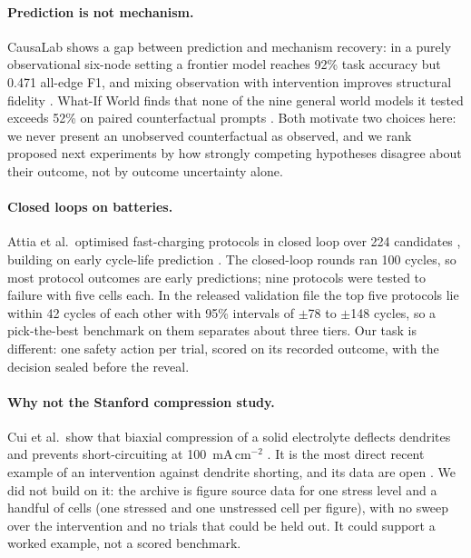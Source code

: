 \documentclass[11pt]{article}
\begin{document}
\paragraph{Prediction is not mechanism.} CausaLab shows a gap between prediction and mechanism recovery: in a purely
observational six-node setting a frontier model reaches 92\% task accuracy but 0.471 all-edge F1, and mixing
observation with intervention improves structural fidelity \citep{yang2026causalab}. What-If World finds that none
of the nine general world models it tested exceeds 52\% on paired counterfactual prompts \citep{cai2026whatif}. Both motivate two choices
here: we never present an unobserved counterfactual as observed, and we rank proposed next experiments by how
strongly competing hypotheses disagree about their outcome, not by outcome uncertainty alone.

\paragraph{Closed loops on batteries.} Attia et al.\ optimised fast-charging protocols in closed loop over 224
candidates \citep{attia2020closed}, building on early cycle-life prediction \citep{severson2019data}. The closed-loop
rounds ran 100 cycles, so most protocol outcomes are early predictions; nine protocols were tested to failure with
five cells each. In the released validation file the top five protocols lie within 42 cycles of each other with 95\%
intervals of $\pm$78 to $\pm$148 cycles, so a pick-the-best benchmark on them separates about three tiers. Our task is
different: one safety action per trial, scored on its recorded outcome, with the decision sealed before the reveal.

\paragraph{Why not the Stanford compression study.} Cui et al.\ show that biaxial compression of a solid electrolyte
deflects dendrites and prevents short-circuiting at 100~mA\,cm$^{-2}$ \citep{cui2026dendrite}. It is the most direct
recent example of an intervention against dendrite shorting, and its data are open \citep{cui2026dendrite_data}. We
did not build on it: the archive is figure source data for one stress level and a handful of cells (one stressed and
one unstressed cell per figure), with no sweep over the intervention and no trials that could be held out. It could
support a worked example, not a scored benchmark.
\end{document}
